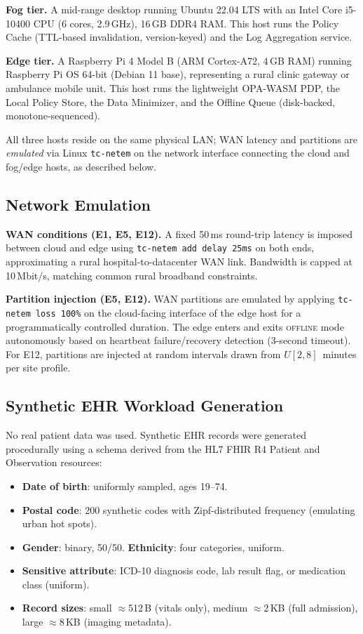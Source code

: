 \documentclass[runningheads]{llncs}
\begin{document}
\noindent\textbf{Fog tier.} A mid-range desktop running Ubuntu 22.04 LTS with an Intel Core i5-10400 CPU (6 cores, 2.9\,GHz), 16\,GB DDR4 RAM. This host runs the Policy Cache (TTL-based invalidation, version-keyed) and the Log Aggregation service.

\noindent\textbf{Edge tier.} A Raspberry Pi 4 Model B (ARM Cortex-A72, 4\,GB RAM) running Raspberry Pi OS 64-bit (Debian 11 base), representing a rural clinic gateway or ambulance mobile unit. This host runs the lightweight OPA-WASM PDP, the Local Policy Store, the Data Minimizer, and the Offline Queue (disk-backed, monotone-sequenced).

All three hosts reside on the same physical LAN; WAN latency and partitions are \emph{emulated} via Linux \texttt{tc-netem} on the network interface connecting the cloud and fog/edge hosts, as described below.

\subsection*{Network Emulation}

\noindent\textbf{WAN conditions (E1, E5, E12).} A fixed 50\,ms round-trip latency is imposed between cloud and edge using \texttt{tc-netem add delay 25ms} on both ends, approximating a rural hospital-to-datacenter WAN link. Bandwidth is capped at 10\,Mbit/s, matching common rural broadband constraints.

\noindent\textbf{Partition injection (E5, E12).} WAN partitions are emulated by applying \texttt{tc-netem loss 100\%} on the cloud-facing interface of the edge host for a programmatically controlled duration. The edge enters and exits \textsc{offline} mode autonomously based on heartbeat failure/recovery detection (3-second timeout). For E12, partitions are injected at random intervals drawn from $U[2, 8]$~minutes per site profile.

\subsection*{Synthetic EHR Workload Generation}

No real patient data was used. Synthetic EHR records were generated procedurally using a schema derived from the HL7 FHIR R4 Patient and Observation resources:

\begin{itemize}[leftmargin=*, itemsep=1pt]
  \item \textbf{Date of birth}: uniformly sampled, ages 19--74.
  \item \textbf{Postal code}: 200 synthetic codes with Zipf-distributed frequency (emulating urban hot spots).
  \item \textbf{Gender}: binary, 50/50. \textbf{Ethnicity}: four categories, uniform.
  \item \textbf{Sensitive attribute}: ICD-10 diagnosis code, lab result flag, or medication class (uniform).
  \item \textbf{Record sizes}: small $\approx$512\,B (vitals only), medium $\approx$2\,KB (full admission), large $\approx$8\,KB (imaging metadata).
\end{itemize}
\end{document}
